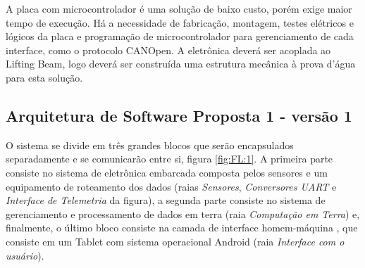 A placa com microcontrolador é uma solução de baixo custo, porém exige maior
tempo de execução. Há a necessidade de fabricação, montagem, testes elétricos e
lógicos da placa e programação de microcontrolador para gerenciamento de cada
interface, como o protocolo CANOpen.
A eletrônica deverá ser acoplada ao Lifting Beam, logo deverá ser construída uma
estrutura mecânica à prova d’água para esta solução.

\subsection{Arquitetura de Software Proposta 1 - versão 1}
O sistema se divide em três grandes blocos que serão encapsulados separadamente
e se comunicarão entre si, figura \ref{fig:FL:1}. A primeira parte consiste no
sistema de eletrônica embarcada composta pelos sensores e um equipamento de
roteamento dos dados (raias \emph{Sensores}, \emph{Conversores UART} e
\emph{Interface de Telemetria} da figura), a segunda parte consiste no sistema
de gerenciamento e processamento de dados em terra (raia \emph{Computação em
Terra}) e, finalmente, o último bloco consiste na camada de interface
homem-máquina , que consiste em um Tablet com sistema operacional Android (raia
\emph{Interface com o usuário}).



